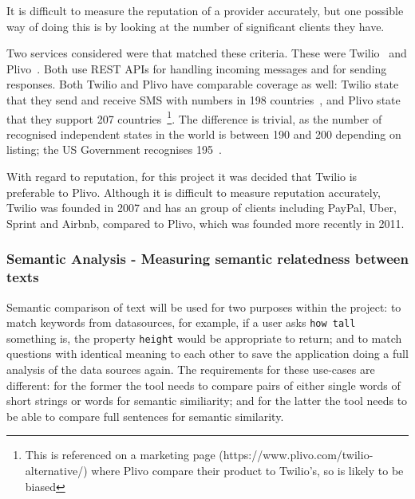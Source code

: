 \documentclass[authoryearcitations]{UoYCSproject}
\begin{document}
It is difficult to measure the reputation of a provider accurately, but one possible way of doing this is by looking at the number of significant clients they have.

Two services considered were that matched these criteria.  These were Twilio~\cite{serviceTwilio} and Plivo~\cite{servicePlivo}. Both use REST APIs for handling incoming messages and for sending responses. Both Twilio and Plivo have comparable coverage as well: Twilio state that they send and receive SMS with numbers in 198 countries~\cite{twilioCoverage}, and Plivo state that they support 207 countries~\cite{plivoCoverage}\footnote{This is referenced on a marketing page (https://www.plivo.com/twilio-alternative/) where Plivo compare their product to Twilio's, so is likely to be biased}. The difference is trivial, as the number of recognised independent states in the world is between 190 and 200 depending on listing; the US Government recognises 195~\cite{usStateDepartmentListOfIndependentStates}.

With regard to reputation, for this project it was decided that Twilio is preferable to Plivo. Although it is difficult to measure reputation accurately, Twilio was founded in 2007 and has an group of clients including PayPal, Uber, Sprint and Airbnb, compared to Plivo, which was founded more recently in 2011.

\subsubsection{Semantic Analysis - Measuring semantic relatedness between texts}
\label{sec:choosingSemanticAnalysisApi}
Semantic comparison of text will be used for two purposes within the project: to match keywords from datasources, for example, if a user asks \texttt{how tall} something is, the property \texttt{height} would be appropriate to return; and to match questions with identical meaning to each other to save the application doing a full analysis of the data sources again. The requirements for these use-cases are different: for the former the tool needs to compare pairs of either single words of short strings or words for semantic similiarity; and for the latter the tool needs to be able to compare full sentences for semantic similarity.
\end{document}
